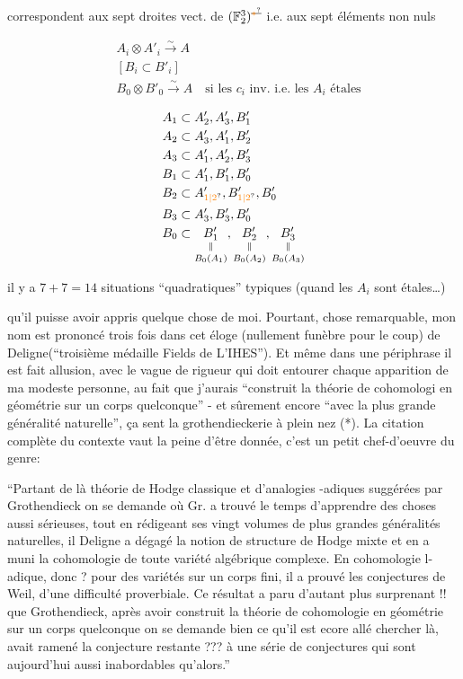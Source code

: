 correspondent aux sept droites vect. de $(\mathbb F_2^3)^{\deleted{\unsure{\ast}}}$ i.e. aux  sept éléments non nuls

\[
\begin{aligned}
&A_i\otimes A'_i\xrightarrow{\sim} A\\
&[B_i\subset B'_i]\\
&B_0\otimes B'_0\xrightarrow{\sim} A\quad\text{si les $c_i$ inv. i.e. les $A_i$ étales}
\end{aligned}
\]

\[
\begin{aligned}
A_1&\subset A'_2,A'_3,B'_1\\
A_2&\subset A'_3,A'_1,B'_2\\
A_3&\subset A'_1,A'_2,B'_3\\
B_1&\subset A'_1,B'_1,B'_0\\
B_2&\subset A'_{\unsure{1|2}},B'_{\unsure{1|2}},B'_0\\
B_3&\subset A'_3,B'_3,B'_0\\
B_0&\subset \underset{B_0(A_1)}{\underset{\Vert}{B'_1}},\underset{B_0(A_2)}{\underset{\Vert}{B'_2}},\underset{B_0(A_3)}{\underset{\Vert}{B'_3}}
\end{aligned}
\]

il y a $7+7=14$ situations ``quadratiques'' typiques (quand les $A_i$ sont étales\ldots)


qu'il puisse avoir appris quelque chose de moi. Pourtant, chose remarquable, mon nom est prononcé trois fois dans cet éloge (nullement funèbre pour le coup) de Deligne(``troisième médaille Fields de L'IHES''). Et même dans une périphrase il est fait allusion, avec le vague de rigueur qui doit entourer chaque apparition de ma modeste personne, au fait que j'aurais ``construit la théorie de cohomologi en géométrie sur un corps quelconque'' - et sûrement encore ``avec la plus grande généralité naturelle'', ça sent la grothendieckerie à plein nez (*). La citation complète du contexte vaut la peine d'être donnée, c'est un petit chef-d'oeuvre du genre:

``Partant de là \handwritten{[}théorie de Hodge classique\handwritten{]} et d'analogies -adiques suggérées par Grothendieck \handwritten{[}on se demande où Gr. a trouvé le temps d'apprendre des choses aussi sérieuses, tout en rédigeant ses vingt volumes de plus grandes généralités naturelles\handwritten{]}, il \handwritten{[}Deligne\handwritten{]} a dégagé la notion de structure de Hodge mixte et en a muni la cohomologie de toute variété algébrique complexe. En cohomologie l-adique, donc \handwritten{[}?\handwritten{]} pour des variétés sur un corps fini, il a prouvé les conjectures de Weil, d'une difficulté proverbiale. Ce résultat a paru d'autant plus surprenant \handwritten{[}!!\handwritten{]} que Grothendieck, après avoir construit la théorie de cohomologie en géométrie sur un corps quelconque \handwritten{[}on se demande bien ce qu'il est ecore allé chercher là\handwritten{]}, avait ramené la conjecture restante \handwritten{[}???\handwritten{]} à une série de conjectures qui sont aujourd'hui aussi inabordables qu'alors.''

